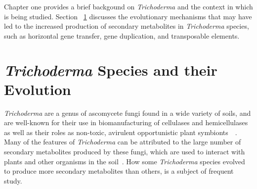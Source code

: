 
Chapter one provides a brief backgound on \textit{Trichoderma} and the context in which is being studied. Section ~\ref{lit:evolution} discusses the evolutionary mechanisms that may have led to the increased production of secondary metabolites in \textit{Trichoderma} species, such as horizontal gene transfer, gene duplication, and transposable elements. 

\section{\textit{Trichoderma} Species and their Evolution}
\label{lit:evolution}

\textit{Trichoderma} are a genus of ascomycete fungi found in a wide
variety of soils, and are well-known for their use in biomanufacturing
of cellulases and hemicellulases as well as their roles as non-toxic,
avirulent opportunistic plant symbionts~\cite{woo2023a}~\cite{kubicek2019a}. 
Many of the features of \textit{Trichoderma}
can be attributed to the large number of secondary metabolites
produced by these fungi, which are used to interact with plants and other organisms in the soil~\cite{Mukherjee2012}. How some \textit{Trichoderma} species evolved to produce more secondary metabolites than others, is a subject of frequent study.


